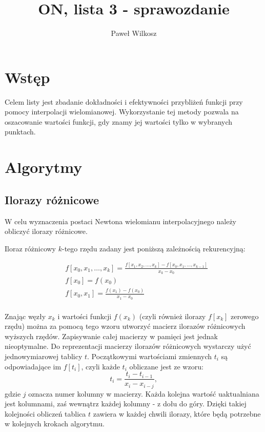 \documentclass{article}
\author{Paweł Wilkosz}
\title{ON, lista 3 - sprawozdanie}
\begin{document}
\maketitle

\section{Wstęp}
Celem listy jest zbadanie dokładności i efektywności przybliżeń funkcji przy pomocy interpolacji wielomianowej.
Wykorzystanie tej metody pozwala na oszacowanie wartości funkcji, gdy znamy jej wartości tylko w wybranych punktach.

\section{Algorytmy}

\subsection{Ilorazy różnicowe}

W celu wyznaczenia postaci Newtona wielomianu interpolacyjnego należy obliczyć ilorazy różnicowe.

Iloraz różnicowy $k$-tego rzędu zadany jest poniższą zależnością rekurencyjną:

$$
\begin{aligned}
&f[x_0,x_1, \ldots, x_k] = \frac{f[x_1,x_2, \ldots, x_k] - f[x_0, x_1, \ldots, x_{k-1}]}{x_k - x_0}\\
&f[x_0] = f(x_0)\\
&f[x_0,x_1] = \frac{f(x_1) - f(x_0)}{x_1 - x_0}\\
\end{aligned}
$$

Znając węzły $x_k$ i wartości funkcji $f(x_k)$ (czyli również ilorazy $f[x_k]$ zerowego rzędu) można za pomocą tego wzoru utworzyć macierz ilorazów różnicowych wyższych rzędów.
Zapisywanie całej macierzy w pamięci jest jednak nieoptymalne.
Do reprezentacji macierzy ilorazów różnicowych wystarczy użyć jednowymiarowej tablicy $t$.
Początkowymi wartościami zmiennych $t_i$ są odpowiadające im $f[t_i]$, czyli każde $t_i$ obliczane jest ze wzoru:
$$t_i = \frac{t_i-t_{i-1}}{x_i-x_{i-j}}, $$	
gdzie $j$ oznacza numer kolumny w macierzy.
Każda kolejna wartość uaktualniana jest kolumnami, zaś wewnątrz każdej kolumny - z dołu do góry.
Dzięki takiej kolejności obliczeń tablica $t$ zawiera w każdej chwili ilorazy, które będą potrzebne w kolejnych krokach algorytmu.
\end{document}
